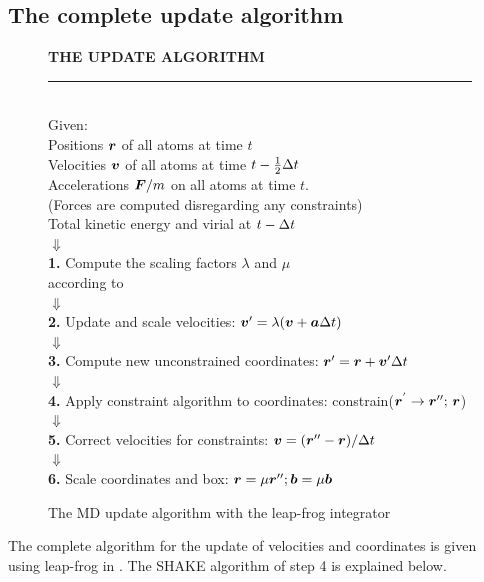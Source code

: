 \subsection{The complete update algorithm}
\begin{figure}
\begin{center}
\addtolength{\fboxsep}{0.5cm}
\begin{shadowenv}[12cm]
{\large \bf THE UPDATE ALGORITHM}
\rule{\textwidth}{2pt} \\
Given:\\
Positions $\mbox{\boldmath ${r}$}$ of all atoms at time $t$ \\
Velocities $\mbox{\boldmath ${v}$}$ of all atoms at time $t-\frac{1}{2} {\Delta t}$ \\
Accelerations $\mbox{\boldmath ${F}$}/m$ on all atoms at time $t$.\\
(Forces are computed disregarding any constraints)\\
Total kinetic energy and virial at $t-{\Delta t}$\\
$\Downarrow$ \\
{\bf 1.} Compute the scaling factors $\lambda$ and $\mu$\\
according to \\   
$\Downarrow$ \\
{\bf 2.} Update and scale velocities: $\mbox{\boldmath ${v}$}' =  \lambda (\mbox{\boldmath ${v}$} +
\mbox{\boldmath ${a}$} \Delta t)$ \\
$\Downarrow$ \\
{\bf 3.} Compute new unconstrained coordinates: $\mbox{\boldmath ${r}$}' = \mbox{\boldmath ${r}$} + \mbox{\boldmath ${v}$}'
\Delta t$ \\
$\Downarrow$ \\
{\bf 4.} Apply constraint algorithm to coordinates: constrain($\mbox{\boldmath ${r}$}^{'} \rightarrow  \mbox{\boldmath ${r}$}'';
\,  \mbox{\boldmath ${r}$}$) \\
$\Downarrow$ \\
{\bf 5.} Correct velocities for constraints: $\mbox{\boldmath ${v}$} = (\mbox{\boldmath ${r}$}'' -
\mbox{\boldmath ${r}$}) / \Delta t$ \\
$\Downarrow$ \\
{\bf 6.} Scale coordinates and box: $\mbox{\boldmath ${r}$} = \mu \mbox{\boldmath ${r}$}''; \mbox{\boldmath ${b}$} =
\mu  \mbox{\boldmath ${b}$}$ \\
\end{shadowenv}
\caption{The MD update algorithm with the leap-frog integrator}
\label{fig:complete-update}
\end{center}
\end{figure}
The complete algorithm for the update of velocities and coordinates is
given using leap-frog in . The SHAKE algorithm of step
4 is explained below. 

